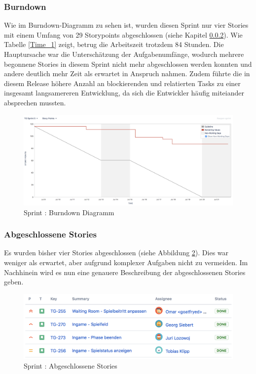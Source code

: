\documentclass[12pt, titlepage]{scrartcl}
\newcommand{\RN}[1]{%
	\textup{\uppercase\expandafter{\romannumeral#1}}%
}
\newcounter{subsubsubsection}[subsubsection]
\begin{document}
        	\subsubsection{Burndown}
        		Wie im Burndown-Diagramm zu sehen ist, wurden diesen Sprint nur vier Stories mit einem Umfang von 29 Storypoints abgeschlossen (siehe Kapitel \ref{done_stories_5}). Wie Tabelle \ref{Time_1} zeigt, betrug die Arbeitszeit trotzdem 84 Stunden. Die Hauptursache war die Untersch\"atzung der Aufgabenumf\"ange, wodurch mehrere begonnene Stories in diesem Sprint nicht mehr abgeschlossen werden konnten und andere deutlich mehr Zeit als erwartet in Anspruch nahmen. Zudem f\"uhrte die in diesem Release h\"ohere Anzahl an blockierenden und relatierten Tasks zu einer insgesamt langsamereren Entwicklung, da sich die Entwickler h\"aufig miteiander absprechen mussten.
	        	\begin{figure}[H] 
	        		\centering
	        		\includegraphics[width=\textwidth]{images/sprintV/burndown.png}
	        		\caption{Sprint \RN{5}: Burndown Diagramm}
	        		\label{Burndown_5}
	        	\end{figure} 
        	\subsubsection{Abgeschlossene Stories} \label{done_stories_5}
        		Es wurden bisher vier Stories abgeschlossen (siehe Abbildung \ref{Done_5}). Dies war weniger als erwartet, aber aufgrund komplexer Aufgaben nicht zu vermeiden. Im Nachhinein wird es nun eine genauere Beschreibung der abgeschlossenen Stories geben.
        		\begin{figure}[H] 
        			\centering
        			\includegraphics[width=\textwidth]{images/sprintV/done.png}
        			\caption{Sprint \RN{5}: Abgeschlossene Stories}
        			\label{Done_5}
        		\end{figure}
\end{document}
